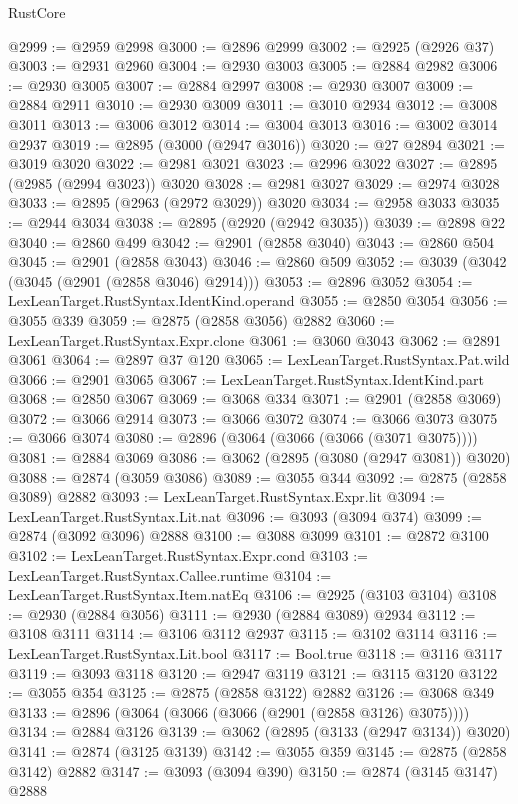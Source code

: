 \begin{lexlean}{RustCore}
\begin{coremodule}
@2999 := @2959 @2998
@3000 := @2896 @2999
@3002 := @2925 (@2926 @37)
@3003 := @2931 @2960
@3004 := @2930 @3003
@3005 := @2884 @2982
@3006 := @2930 @3005
@3007 := @2884 @2997
@3008 := @2930 @3007
@3009 := @2884 @2911
@3010 := @2930 @3009
@3011 := @3010 @2934
@3012 := @3008 @3011
@3013 := @3006 @3012
@3014 := @3004 @3013
@3016 := @3002 @3014 @2937
@3019 := @2895 (@3000 (@2947 @3016))
@3020 := @27 @2894
@3021 := @3019 @3020
@3022 := @2981 @3021
@3023 := @2996 @3022
@3027 := @2895 (@2985 (@2994 @3023)) @3020
@3028 := @2981 @3027
@3029 := @2974 @3028
@3033 := @2895 (@2963 (@2972 @3029)) @3020
@3034 := @2958 @3033
@3035 := @2944 @3034
@3038 := @2895 (@2920 (@2942 @3035))
@3039 := @2898 @22
@3040 := @2860 @499
@3042 := @2901 (@2858 @3040)
@3043 := @2860 @504
@3045 := @2901 (@2858 @3043)
@3046 := @2860 @509
@3052 := @3039 (@3042 (@3045 (@2901 (@2858 @3046) @2914)))
@3053 := @2896 @3052
@3054 := LexLeanTarget.RustSyntax.IdentKind.operand
@3055 := @2850 @3054
@3056 := @3055 @339
@3059 := @2875 (@2858 @3056) @2882
@3060 := LexLeanTarget.RustSyntax.Expr.clone
@3061 := @3060 @3043
@3062 := @2891 @3061
@3064 := @2897 @37 @120
@3065 := LexLeanTarget.RustSyntax.Pat.wild
@3066 := @2901 @3065
@3067 := LexLeanTarget.RustSyntax.IdentKind.part
@3068 := @2850 @3067
@3069 := @3068 @334
@3071 := @2901 (@2858 @3069)
@3072 := @3066 @2914
@3073 := @3066 @3072
@3074 := @3066 @3073
@3075 := @3066 @3074
@3080 := @2896 (@3064 (@3066 (@3066 (@3071 @3075))))
@3081 := @2884 @3069
@3086 := @3062 (@2895 (@3080 (@2947 @3081)) @3020)
@3088 := @2874 (@3059 @3086)
@3089 := @3055 @344
@3092 := @2875 (@2858 @3089) @2882
@3093 := LexLeanTarget.RustSyntax.Expr.lit
@3094 := LexLeanTarget.RustSyntax.Lit.nat
@3096 := @3093 (@3094 @374)
@3099 := @2874 (@3092 @3096) @2888
@3100 := @3088 @3099
@3101 := @2872 @3100
@3102 := LexLeanTarget.RustSyntax.Expr.cond
@3103 := LexLeanTarget.RustSyntax.Callee.runtime
@3104 := LexLeanTarget.RustSyntax.Item.natEq
@3106 := @2925 (@3103 @3104)
@3108 := @2930 (@2884 @3056)
@3111 := @2930 (@2884 @3089) @2934
@3112 := @3108 @3111
@3114 := @3106 @3112 @2937
@3115 := @3102 @3114
@3116 := LexLeanTarget.RustSyntax.Lit.bool
@3117 := Bool.true
@3118 := @3116 @3117
@3119 := @3093 @3118
@3120 := @2947 @3119
@3121 := @3115 @3120
@3122 := @3055 @354
@3125 := @2875 (@2858 @3122) @2882
@3126 := @3068 @349
@3133 := @2896 (@3064 (@3066 (@3066 (@2901 (@2858 @3126) @3075))))
@3134 := @2884 @3126
@3139 := @3062 (@2895 (@3133 (@2947 @3134)) @3020)
@3141 := @2874 (@3125 @3139)
@3142 := @3055 @359
@3145 := @2875 (@2858 @3142) @2882
@3147 := @3093 (@3094 @390)
@3150 := @2874 (@3145 @3147) @2888

\end{coremodule}
\end{lexlean}
